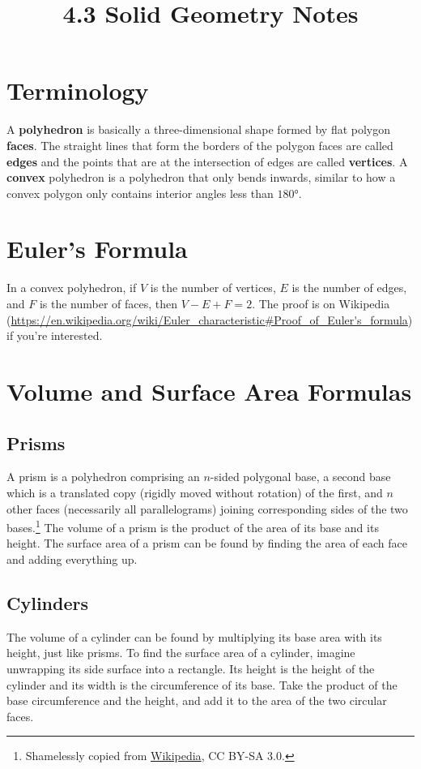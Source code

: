 \documentclass{article}
\title{4.3 Solid Geometry Notes}
\author{}
\date{}
\begin{document}
\maketitle
\begin{multicols}{2}
	\section*{Terminology}
	A \textbf{polyhedron} is basically a three-dimensional shape formed by flat polygon \textbf{faces}.
	The straight lines that form the borders of the polygon faces are called \textbf{edges} and the points that are at the intersection of edges are called \textbf{vertices}.
	A \textbf{convex} polyhedron is a polyhedron that only bends inwards, similar to how a convex polygon only contains interior angles less than $\ang{180}$.

	\section*{Euler's Formula}
	In a convex polyhedron, if $V$ is the number of vertices, $E$ is the number of edges, and $F$ is the number of faces, then $V - E + F = 2$.
	The proof is on Wikipedia (\url{https://en.wikipedia.org/wiki/Euler_characteristic#Proof_of_Euler's_formula}) if you're interested.
	
	\section*{Volume and Surface Area Formulas}
	\subsection*{Prisms}
	A prism is a polyhedron comprising an $n$-sided polygonal base, a second base which is a translated copy (rigidly moved without rotation) of the first, and $n$ other faces (necessarily all parallelograms) joining corresponding sides of the two bases.\footnote{Shamelessly copied from \href{https://en.wikipedia.org/wiki/Prism_(geometry)}{Wikipedia}, CC BY-SA 3.0.}
	The volume of a prism is the product of the area of its base and its height.
	The surface area of a prism can be found by finding the area of each face and adding everything up.

	\subsection*{Cylinders}
	The volume of a cylinder can be found by multiplying its base area with its height, just like prisms.
	To find the surface area of a cylinder, imagine unwrapping its side surface into a rectangle.
	Its height is the height of the cylinder and its width is the circumference of its base.
	Take the product of the base circumference and the height, and add it to the area of the two circular faces.


\end{multicols}
\end{document}

